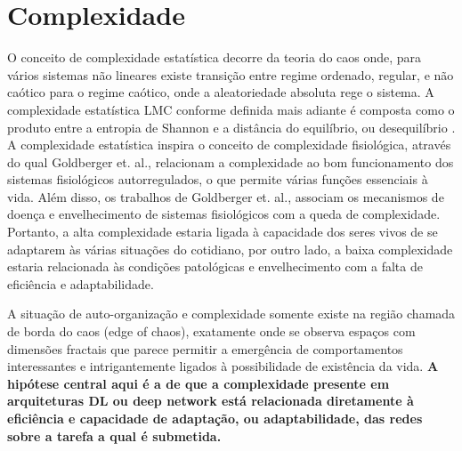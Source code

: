 \documentclass[
	12pt,				%
	openany,oneside,
	a4paper,			%
	english,			%
	brazil,				%
	]{abntex2}
\begin{document}
\section{Complexidade}
O conceito de complexidade estatística decorre da teoria do caos onde, para vários sistemas não lineares existe transição entre regime ordenado, regular, e não caótico para o regime caótico, onde a aleatoriedade absoluta rege o sistema. A complexidade estatística LMC conforme definida mais adiante é composta como o produto entre a entropia de Shannon e a distância do equilíbrio, ou desequilíbrio \cite{c28}. A complexidade estatística inspira o conceito de complexidade fisiológica, através do qual Goldberger et. al., \cite{c29, c30, c31} relacionam a complexidade ao bom funcionamento dos sistemas fisiológicos autorregulados, o que permite várias funções essenciais à vida. Além disso, os trabalhos de Goldberger et. al., associam os mecanismos de doença e envelhecimento de sistemas fisiológicos com a queda de complexidade. Portanto, a alta complexidade estaria ligada à capacidade dos seres vivos de se adaptarem às várias situações do cotidiano, por outro lado, a baixa complexidade estaria relacionada às condições patológicas e envelhecimento com a falta de eficiência e adaptabilidade.

A situação de auto-organização e complexidade somente existe na região chamada de borda do caos (edge of chaos), exatamente onde se observa espaços com dimensões fractais que parece permitir a emergência de comportamentos interessantes e intrigantemente ligados à possibilidade de existência da vida. \textbf{A hipótese central aqui é a de que a complexidade presente em arquiteturas DL ou deep network está relacionada diretamente à eficiência e capacidade de adaptação, ou adaptabilidade, das redes sobre a tarefa a qual é submetida.}
\end{document}
